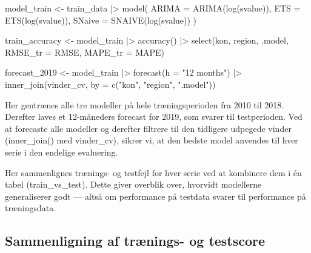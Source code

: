 \documentclass[
]{article}
\newenvironment{Shaded}{\begin{snugshade}}{\end{snugshade}}
\newcommand{\AttributeTok}[1]{\textcolor[rgb]{0.40,0.45,0.13}{#1}}
\newcommand{\FunctionTok}[1]{\textcolor[rgb]{0.28,0.35,0.67}{#1}}
\newcommand{\NormalTok}[1]{\textcolor[rgb]{0.00,0.23,0.31}{#1}}
\newcommand{\OtherTok}[1]{\textcolor[rgb]{0.00,0.23,0.31}{#1}}
\newcommand{\SpecialCharTok}[1]{\textcolor[rgb]{0.37,0.37,0.37}{#1}}
\newcommand{\StringTok}[1]{\textcolor[rgb]{0.13,0.47,0.30}{#1}}
\begin{document}
\begin{Shaded}
\begin{Highlighting}[]
\NormalTok{model\_train }\OtherTok{\textless{}{-}}\NormalTok{ train\_data }\SpecialCharTok{|\textgreater{}}
  \FunctionTok{model}\NormalTok{(}
    \AttributeTok{ARIMA  =} \FunctionTok{ARIMA}\NormalTok{(}\FunctionTok{log}\NormalTok{(svalue)),}
    \AttributeTok{ETS    =} \FunctionTok{ETS}\NormalTok{(}\FunctionTok{log}\NormalTok{(svalue)),}
    \AttributeTok{SNaive =} \FunctionTok{SNAIVE}\NormalTok{(}\FunctionTok{log}\NormalTok{(svalue))}
\NormalTok{  )}

\NormalTok{train\_accuracy }\OtherTok{\textless{}{-}}\NormalTok{ model\_train }\SpecialCharTok{|\textgreater{}} 
  \FunctionTok{accuracy}\NormalTok{() }\SpecialCharTok{|\textgreater{}} 
  \FunctionTok{select}\NormalTok{(kon, region, .model, }\AttributeTok{RMSE\_tr =}\NormalTok{ RMSE, }\AttributeTok{MAPE\_tr =}\NormalTok{ MAPE)}

\NormalTok{forecast\_2019 }\OtherTok{\textless{}{-}}\NormalTok{ model\_train }\SpecialCharTok{|\textgreater{}}
  \FunctionTok{forecast}\NormalTok{(}\AttributeTok{h =} \StringTok{"12 months"}\NormalTok{) }\SpecialCharTok{|\textgreater{}}
  \FunctionTok{inner\_join}\NormalTok{(vinder\_cv,                      }
             \AttributeTok{by =} \FunctionTok{c}\NormalTok{(}\StringTok{"kon"}\NormalTok{, }\StringTok{"region"}\NormalTok{, }\StringTok{".model"}\NormalTok{))}
\end{Highlighting}
\end{Shaded}

Her gentrænes alle tre modeller på hele træningsperioden fra 2010 til
2018. Derefter laves et 12-måneders forecast for 2019, som svarer til
testperioden. Ved at forecaste alle modeller og derefter filtrere til
den tidligere udpegede vinder (inner\_join() med vinder\_cv), sikrer vi,
at den bedste model anvendes til hver serie i den endelige evaluering.

Her sammenlignes trænings- og testfejl for hver serie ved at kombinere
dem i én tabel (train\_vs\_test). Dette giver overblik over, hvorvidt
modellerne generaliserer godt --- altså om performance på testdata
svarer til performance på træningsdata.

\subsection{Sammenligning af trænings- og
testscore}\label{sammenligning-af-truxe6nings--og-testscore}
\end{document}
